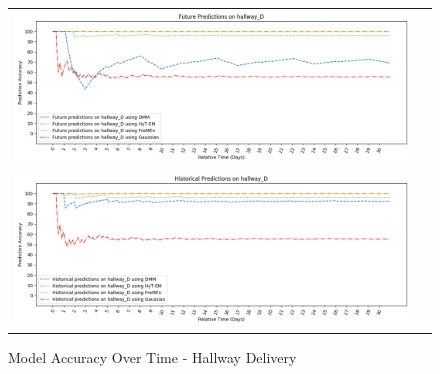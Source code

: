 \begin{center}
\begin{figure}[!Hp]
  \begin{tabular}{cc}
    {\includegraphics[width = 6in]{images/results/Future_Predictions_on_hallway_D.png}} \\
    {\includegraphics[width = 6in]{images/results/Historical_Predictions_on_hallway_D.png}} \\
  \end{tabular}
  \caption{Model Accuracy Over Time - Hallway Delivery}
\end{figure}\\ \\



\end{center}
